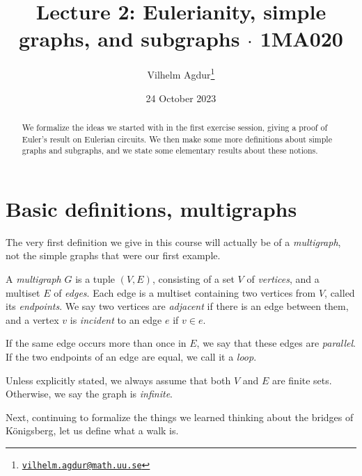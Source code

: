 \documentclass[nobib]{tufte-handout}
\title{Lecture 2: Eulerianity, simple graphs, and subgraphs $\cdot$ 1MA020}
\author[Vilhelm Agdur]{Vilhelm Agdur\thanks{\href{mailto:vilhelm.agdur@math.uu.se}{\nolinkurl{vilhelm.agdur@math.uu.se}}}}
\date{24 October 2023}
\begin{document}
\maketitle%

\begin{abstract}
\noindent
We formalize the ideas we started with in the first exercise session, giving a proof of Euler's result on Eulerian circuits. We then make some more definitions about simple graphs and subgraphs, and we state some elementary results about these notions.
\end{abstract}

\section{Basic definitions, multigraphs}

The very first definition we give in this course will actually be of a \emph{multigraph}, not the simple graphs that were our first example.

\begin{definition}
    A \emph{multigraph} $G$ is a tuple $(V, E)$, consisting of a set $V$ of \emph{vertices}, and a multiset $E$ of \emph{edges}. Each edge is a multiset containing two vertices from $V$, called its \emph{endpoints}. We say two vertices are \emph{adjacent} if there is an edge between them, and a vertex $v$ is \emph{incident} to an edge $e$ if $v \in e$.

    If the same edge occurs more than once in $E$, we say that these edges are \emph{parallel}. If the two endpoints of an edge are equal, we call it a \emph{loop}.

    Unless explicitly stated, we always assume that both $V$ and $E$ are finite sets. Otherwise, we say the graph is \emph{infinite}.
\end{definition}

Next, continuing to formalize the things we learned thinking about the bridges of Königsberg, let us define what a walk is.
\end{document}
